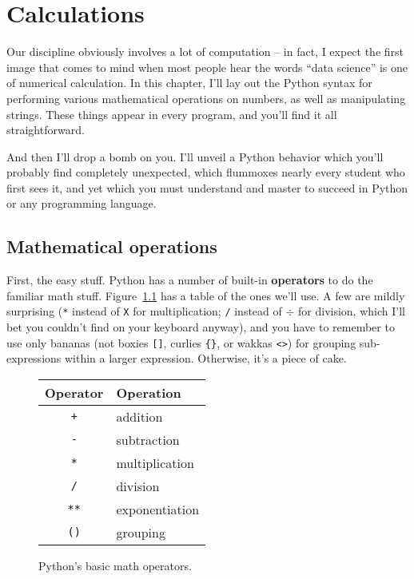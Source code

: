 

\chapter{Calculations}

Our discipline obviously involves a lot of computation -- in fact, I expect the
first image that comes to mind when most people hear the words ``data science''
is one of numerical calculation. In this chapter, I'll lay out the Python
syntax for performing various mathematical operations on numbers, as well as
manipulating strings. These things appear in every program, and you'll find it
all straightforward.

And then I'll drop a bomb on you. I'll unveil a Python behavior which you'll
probably find completely unexpected, which flummoxes nearly every student who
first sees it, and yet which you must understand and master to succeed in
Python or any programming language.

\section{Mathematical operations}



First, the easy stuff. Python has a number of built-in \textbf{operators} to do
the familiar math stuff. Figure~\ref{fig:mathOps} has a table of the ones we'll
use. A few are mildly surprising (\texttt{*} instead of \texttt{X} for
multiplication; \texttt{/} instead of $\div$ for division, which I'll bet you
couldn't find on your keyboard anyway), and you have to remember to use only
bananas (not boxies \texttt{[]}, curlies \texttt{\{\}}, or wakkas \texttt{<>})
for grouping sub-expressions within a larger expression. Otherwise, it's a
piece of cake.

\begin{figure}[ht]
\centering
\begin{tabular}{c | l}
\hline
Operator & Operation \\
\hline
\texttt{+} & addition \\
\texttt{-} & subtraction \\
\texttt{*} & multiplication \\
\texttt{/} & division \\
\texttt{**} & exponentiation \\
\texttt{()} & grouping \\
\hline
\end{tabular}
\smallskip
\caption{Python's basic math operators.}
\label{fig:mathOps}
\end{figure}

